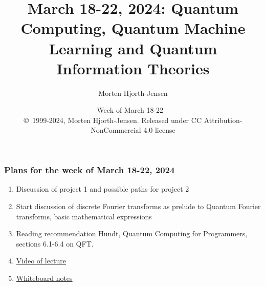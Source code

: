 \documentclass{beamer}
\begin{document}

\newcommand{\exercisesection}[1]{\subsection*{#1}}







\title{March 18-22, 2024: Quantum Computing, Quantum Machine Learning and Quantum Information Theories}


\author{Morten Hjorth-Jensen}

\date{Week of March 18-22
\ \\ 
{\tiny \copyright\ 1999-2024, Morten Hjorth-Jensen. Released under CC Attribution-NonCommercial 4.0 license}
}

\begin{frame}
\titlepage
\end{frame}

\begin{frame}
\frametitle{Plans for the week of March 18-22, 2024}

\begin{block}{}
\begin{enumerate}
\item Discussion of project 1 and possible paths for project 2

\item Start discussion of discrete Fourier transforms as prelude to Quantum Fourier transforms, basic mathematical expressions

\item Reading recommendation Hundt, Quantum Computing for Programmers, sections 6.1-6.4 on QFT.

\item \href{{https://youtu.be/kR-4qqtFyxQ}}{Video of lecture}

\item \href{{https://github.com/CompPhysics/QuantumComputingMachineLearning/blob/gh-pages/doc/HandWrittenNotes/2024/NotesMarch20.pdf}}{Whiteboard notes}
\end{enumerate}

\noindent
\end{block}
\end{frame}
\end{document}
